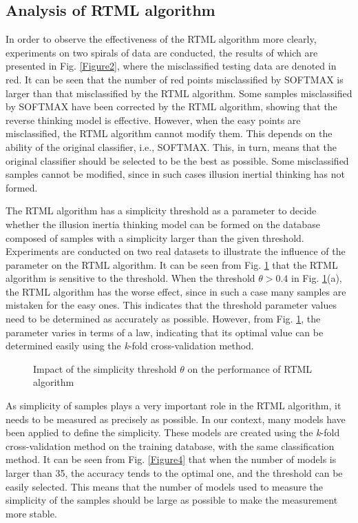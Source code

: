 \subsection{Analysis of RTML algorithm}
In order to observe the effectiveness of the RTML algorithm more clearly, experiments on two spirals of data are conducted, the results of which are presented in Fig. \ref{Figure2}, where the misclassified testing data are denoted in red. It can be seen that the number of red points misclassified by SOFTMAX is larger than that misclassified by the RTML algorithm. Some samples misclassified by SOFTMAX have been corrected by the RTML algorithm, showing that the reverse thinking model is effective. However, when the easy points are misclassified, the RTML algorithm cannot modify them. This depends on the ability of the original classifier, i.e., SOFTMAX. This, in turn, means that the original classifier should be selected to be the best as possible. Some misclassified samples cannot be modified, since in such cases illusion inertial thinking has not formed.

The RTML algorithm has a simplicity threshold as a parameter to decide whether the illusion inertia thinking model can be formed on the database composed of samples with a simplicity larger than the given threshold. Experiments are conducted on two real datasets to illustrate the influence of the parameter on the RTML algorithm. It can be seen from Fig. \ref{Figure3} that the RTML algorithm is sensitive to the threshold. When the threshold $\theta>0.4$ in Fig. \ref{Figure3}(a), the RTML algorithm has the worse effect, since in such a case many samples are mistaken for the easy ones. This indicates that the threshold parameter values need to be determined as accurately as possible. However, from Fig. \ref{Figure3}, the parameter varies in terms of a law, indicating that its optimal value can be determined easily using the \emph{k}-fold cross-validation method.

\begin{figure}
  \centering
  \hspace{0 in}
  \caption{Impact of the simplicity threshold $\theta$ on the performance of RTML algorithm}
  \label{Figure3}
\end{figure}

As simplicity of samples plays a very important role in the RTML algorithm, it needs to be measured as precisely as possible. In our context, many models have been applied to define the simplicity. These models are created using the \emph{k}-fold cross-validation method on the training database, with the same classification method. It can be seen from Fig. \ref{Figure4} that when the number of models is larger than 35, the accuracy tends to the optimal one, and the threshold can be easily selected. This means that the number of models used to measure the simplicity of the samples should be large as possible to make the measurement more stable.

